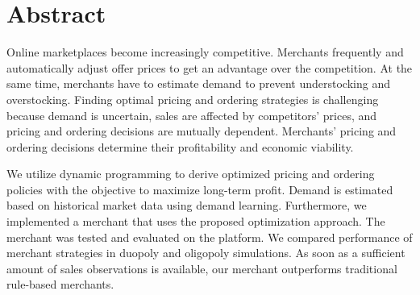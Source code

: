 \chapter*{Abstract}
Online marketplaces become increasingly competitive.
Merchants frequently and automatically adjust offer prices to get an advantage over the competition.
At the same time, merchants have to estimate demand to prevent understocking and overstocking.
Finding optimal pricing and ordering strategies is challenging because demand is uncertain, sales are affected by competitors' prices, and pricing and ordering decisions are mutually dependent.
Merchants' pricing and ordering decisions determine their profitability and economic viability.

We utilize dynamic programming to derive optimized pricing and ordering policies with the objective to maximize long-term profit.
Demand is estimated based on historical market data using demand learning.
Furthermore, we implemented a merchant that uses the proposed optimization approach.
The merchant was tested and evaluated on the \pricewars platform.
We compared performance of merchant strategies in duopoly and oligopoly simulations.
As soon as a sufficient amount of sales observations is available, our merchant outperforms traditional rule-based merchants.

